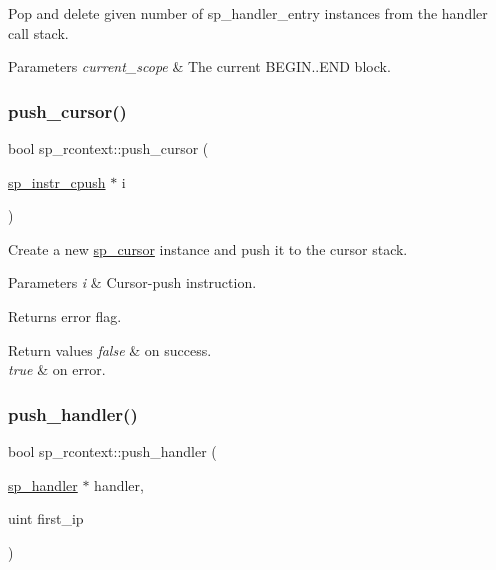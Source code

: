Pop and delete given number of sp\+\_\+handler\+\_\+entry instances from the handler call stack.


\begin{DoxyParams}{Parameters}
{\em current\+\_\+scope} & The current B\+E\+G\+IN..E\+ND block. \\
\hline
\end{DoxyParams}
\mbox{\label{classsp__rcontext_ae8d09ba5618c7691077afef86da53de8}} 
\subsubsection{\texorpdfstring{push\+\_\+cursor()}{push\_cursor()}}
{\footnotesize\ttfamily bool sp\+\_\+rcontext\+::push\+\_\+cursor (\begin{DoxyParamCaption}\item[{\mbox{\hyperlink{classsp__instr__cpush}{sp\+\_\+instr\+\_\+cpush}} $\ast$}]{i }\end{DoxyParamCaption})}

Create a new \mbox{\hyperlink{classsp__cursor}{sp\+\_\+cursor}} instance and push it to the cursor stack.


\begin{DoxyParams}{Parameters}
{\em i} & Cursor-\/push instruction.\\
\hline
\end{DoxyParams}
\begin{DoxyReturn}{Returns}
error flag. 
\end{DoxyReturn}

\begin{DoxyRetVals}{Return values}
{\em false} & on success. \\
\hline
{\em true} & on error. \\
\hline
\end{DoxyRetVals}
\mbox{\label{classsp__rcontext_a59a9f37626871fa3325799c5c3cf07ed}} 
\subsubsection{\texorpdfstring{push\+\_\+handler()}{push\_handler()}}
{\footnotesize\ttfamily bool sp\+\_\+rcontext\+::push\+\_\+handler (\begin{DoxyParamCaption}\item[{\mbox{\hyperlink{classsp__handler}{sp\+\_\+handler}} $\ast$}]{handler,  }\item[{uint}]{first\+\_\+ip }\end{DoxyParamCaption})}


